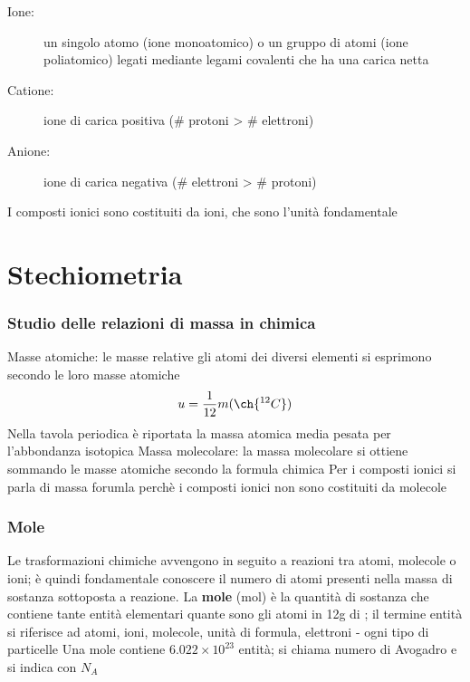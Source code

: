 \documentclass[a4paper,11pt]{report}
\begin{document}
\begin{description}
	\item[Ione:] un singolo atomo (ione monoatomico) o un gruppo di atomi (ione poliatomico) legati mediante legami covalenti che ha una carica netta 
 \item[Catione:] ione di carica positiva (\# protoni > \# elettroni)
 \item[Anione:] ione di carica negativa (\# elettroni > \# protoni)  
\end{description}

\noindent I composti ionici sono costituiti da ioni, che sono l'unità fondamentale

\chapter{Stechiometria}
\subsection*{Studio delle relazioni di massa in chimica}

Masse atomiche: le masse relative gli atomi dei diversi elementi si esprimono secondo le loro masse atomiche 
\[u = \frac{1}{12}m(\ch{^{12}C})\]
Nella tavola periodica è riportata la massa atomica media pesata per l'abbondanza isotopica \newline
Massa molecolare: la massa molecolare si ottiene sommando le masse atomiche secondo la formula chimica \newline
Per i composti ionici si parla di massa forumla perchè i composti ionici non sono costituiti da molecole 

\subsection*{Mole}
Le trasformazioni chimiche avvengono in seguito a reazioni tra atomi, molecole o ioni; è quindi fondamentale conoscere il numero di atomi presenti nella massa di sostanza sottoposta a reazione. \newline
La \textbf{mole} (mol) è la quantità di sostanza che contiene tante entità elementari quante sono gli atomi in 12g di ; il termine entità si riferisce ad atomi, ioni, molecole, unità di formula, elettroni - ogni tipo di particelle \newline
Una mole contiene $6.022\times 10^{23}$ entità; si chiama numero di Avogadro e si indica con $N_A$
\end{document}
